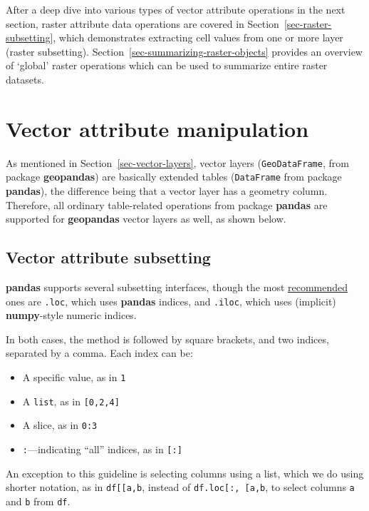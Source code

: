 \documentclass[
  letterpaper,
]{krantz}
\providecommand{\tightlist}{%
  \setlength{\itemsep}{0pt}\setlength{\parskip}{0pt}}\usepackage{longtable,booktabs,array}
\begin{document}
After a deep dive into various types of vector attribute operations in
the next section, raster attribute data operations are covered in
Section~\ref{sec-raster-subsetting}, which demonstrates extracting cell
values from one or more layer (raster subsetting).
Section~\ref{sec-summarizing-raster-objects} provides an overview of
`global' raster operations which can be used to summarize entire raster
datasets.

\section{Vector attribute
manipulation}\label{sec-vector-attribute-manipulation}

As mentioned in Section~\ref{sec-vector-layers}, vector layers
(\texttt{GeoDataFrame}, from package \textbf{geopandas}) are basically
extended tables (\texttt{DataFrame} from package \textbf{pandas}), the
difference being that a vector layer has a geometry column. Therefore,
all ordinary table-related operations from package \textbf{pandas} are
supported for \textbf{geopandas} vector layers as well, as shown below.

\subsection{Vector attribute
subsetting}\label{sec-vector-attribute-subsetting}

\textbf{pandas} supports several subsetting interfaces, though the most
\href{https://stackoverflow.com/questions/38886080/python-pandas-series-why-use-loc}{recommended}
ones are \texttt{.loc}, which uses \textbf{pandas} indices, and
\texttt{.iloc}, which uses (implicit) \textbf{numpy}-style numeric
indices.

In both cases, the method is followed by square brackets, and two
indices, separated by a comma. Each index can be:

\begin{itemize}
\tightlist
\item
  A specific value, as in \texttt{1}
\item
  A \texttt{list}, as in \texttt{{[}0,2,4{]}}
\item
  A slice, as in \texttt{0:3}
\item
  \texttt{:}---indicating ``all'' indices, as in \texttt{{[}:{]}}
\end{itemize}

An exception to this guideline is selecting columns using a list, which
we do using shorter notation, as in
\texttt{df{[}{[}\textquotesingle{}a\textquotesingle{},\textquotesingle{}b\textquotesingle{}{]}{]}},
instead of
\texttt{df.loc{[}:,\ {[}\textquotesingle{}a\textquotesingle{},\textquotesingle{}b\textquotesingle{}{]}{]}},
to select columns \texttt{\textquotesingle{}a\textquotesingle{}} and
\texttt{\textquotesingle{}b\textquotesingle{}} from \texttt{df}.
\end{document}
